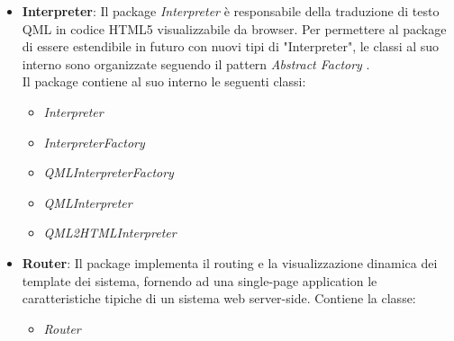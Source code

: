 \begin{itemize}
	\item \textbf{Interpreter}:
	Il package \emph{Interpreter} è responsabile della traduzione di testo QML in codice HTML5 visualizzabile da browser. Per permettere al package di essere estendibile in futuro con nuovi tipi di "Interpreter", le classi al suo interno sono organizzate seguendo il pattern \emph{Abstract Factory} . \\
	Il package contiene al suo interno le seguenti classi:
	\begin{itemize}
	\item \textit{Interpreter}
	\item \textit{InterpreterFactory}
	\item \textit{QMLInterpreterFactory}
	\item \textit{QMLInterpreter}
	\item \textit{QML2HTMLInterpreter}
	\end{itemize}
		
	\item \textbf{Router}:
Il package implementa il routing e la visualizzazione dinamica dei template dei sistema, fornendo ad una single-page application le caratteristiche tipiche di un sistema web server-side. Contiene la classe:
\begin{itemize}
	\item\textit{Router}
\end{itemize}
\end{itemize}

\newpage